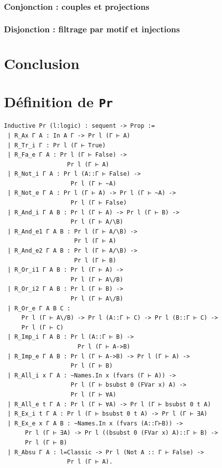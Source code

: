 \documentclass[a4paper]{article}
\theoremstyle{remark}
\theoremstyle{remark}
\theoremstyle{remark}
\theoremstyle{definition}
\theoremstyle{definition}
\theoremstyle{definition}
\begin{document}
\subsubsection{Conjonction : couples et projections}

\subsubsection{Disjonction : filtrage par motif et injections}


\section{Conclusion}


\nocite{*}


\appendix
\newpage

\section{Définition de \texttt{Pr}} \label{pr}

\begin{verbatim}
Inductive Pr (l:logic) : sequent -> Prop :=
 | R_Ax Γ A : In A Γ -> Pr l (Γ ⊢ A)
 | R_Tr_i Γ : Pr l (Γ ⊢ True)
 | R_Fa_e Γ A : Pr l (Γ ⊢ False) ->
                  Pr l (Γ ⊢ A)
 | R_Not_i Γ A : Pr l (A::Γ ⊢ False) ->
                   Pr l (Γ ⊢ ~A)
 | R_Not_e Γ A : Pr l (Γ ⊢ A) -> Pr l (Γ ⊢ ~A) ->
                   Pr l (Γ ⊢ False)
 | R_And_i Γ A B : Pr l (Γ ⊢ A) -> Pr l (Γ ⊢ B) ->
                   Pr l (Γ ⊢ A/\B)
 | R_And_e1 Γ A B : Pr l (Γ ⊢ A/\B) ->
                    Pr l (Γ ⊢ A)
 | R_And_e2 Γ A B : Pr l (Γ ⊢ A/\B) ->
                    Pr l (Γ ⊢ B)
 | R_Or_i1 Γ A B : Pr l (Γ ⊢ A) ->
                   Pr l (Γ ⊢ A\/B)
 | R_Or_i2 Γ A B : Pr l (Γ ⊢ B) ->
                   Pr l (Γ ⊢ A\/B)
 | R_Or_e Γ A B C :
     Pr l (Γ ⊢ A\/B) -> Pr l (A::Γ ⊢ C) -> Pr l (B::Γ ⊢ C) ->
     Pr l (Γ ⊢ C)
 | R_Imp_i Γ A B : Pr l (A::Γ ⊢ B) ->
                     Pr l (Γ ⊢ A->B)
 | R_Imp_e Γ A B : Pr l (Γ ⊢ A->B) -> Pr l (Γ ⊢ A) ->
                   Pr l (Γ ⊢ B)
 | R_All_i x Γ A : ~Names.In x (fvars (Γ ⊢ A)) ->
                   Pr l (Γ ⊢ bsubst 0 (FVar x) A) ->
                   Pr l (Γ ⊢ ∀A)
 | R_All_e t Γ A : Pr l (Γ ⊢ ∀A) -> Pr l (Γ ⊢ bsubst 0 t A)
 | R_Ex_i t Γ A : Pr l (Γ ⊢ bsubst 0 t A) -> Pr l (Γ ⊢ ∃A)
 | R_Ex_e x Γ A B : ~Names.In x (fvars (A::Γ⊢B)) ->
      Pr l (Γ ⊢ ∃A) -> Pr l ((bsubst 0 (FVar x) A)::Γ ⊢ B) ->
      Pr l (Γ ⊢ B)
 | R_Absu Γ A : l=Classic -> Pr l (Not A :: Γ ⊢ False) ->
                  Pr l (Γ ⊢ A).
\end{verbatim}
\end{document}
